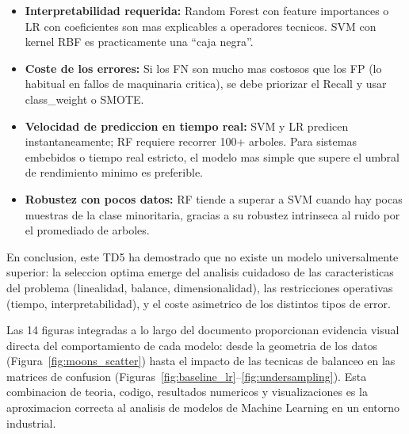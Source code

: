 \documentclass[12pt,a4paper]{article}
\begin{document}
\begin{itemize}
  \item \textbf{Interpretabilidad requerida:} Random Forest con feature importances o LR con
    coeficientes son mas explicables a operadores tecnicos. SVM con kernel RBF es practicamente
    una ``caja negra''.

  \item \textbf{Coste de los errores:} Si los FN son mucho mas costosos que los FP (lo habitual
    en fallos de maquinaria critica), se debe priorizar el Recall y usar class\_weight o SMOTE.

  \item \textbf{Velocidad de prediccion en tiempo real:} SVM y LR predicen instantaneamente; RF
    requiere recorrer 100+ arboles. Para sistemas embebidos o tiempo real estricto, el modelo
    mas simple que supere el umbral de rendimiento minimo es preferible.

  \item \textbf{Robustez con pocos datos:} RF tiende a superar a SVM cuando hay pocas muestras
    de la clase minoritaria, gracias a su robustez intrinseca al ruido por el promediado de
    arboles.
\end{itemize}

En conclusion, este TD5 ha demostrado que no existe un modelo universalmente superior: la
seleccion optima emerge del analisis cuidadoso de las caracteristicas del problema (linealidad,
balance, dimensionalidad), las restricciones operativas (tiempo, interpretabilidad), y el coste
asimetrico de los distintos tipos de error.

Las 14 figuras integradas a lo largo del documento proporcionan evidencia visual directa del
comportamiento de cada modelo: desde la geometria de los datos (Figura~\ref{fig:moons_scatter})
hasta el impacto de las tecnicas de balanceo en las matrices de confusion
(Figuras~\ref{fig:baseline_lr}--\ref{fig:undersampling}). Esta combinacion de teoria,
codigo, resultados numericos y visualizaciones es la aproximacion correcta al analisis de
modelos de Machine Learning en un entorno industrial.

\end{document}
